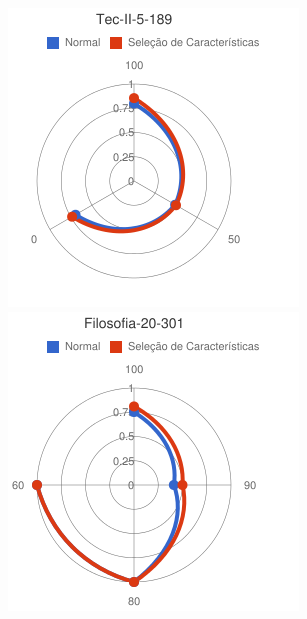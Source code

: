 \begin{figure}
\begin{minipage}{.3\textwidth}
\end{minipage}%
\begin{minipage}{.3\textwidth}
  \centering
  \includegraphics[width=\linewidth]{img/red-ufes-moodle/image17.png}
\end{minipage} %
\begin{minipage}{.3\textwidth}
  \centering
  \includegraphics[width=\linewidth]{img/red-ufes-moodle/image18.png}

\end{minipage}
\end{figure}
